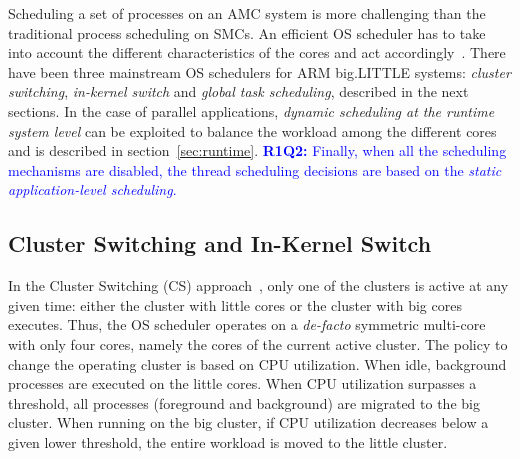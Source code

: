 Scheduling a set of processes on an AMC system is more challenging than the traditional process scheduling on SMCs. 
An efficient OS scheduler has to take into account the different characteristics of the cores and act accordingly~\cite{coolingAware}.
There have been three mainstream OS schedulers for ARM big.LITTLE systems: \textit{cluster switching}, 
\textit{in-kernel switch} and \textit{global task scheduling}, described in the next sections.
In the case of parallel applications, \textit{dynamic scheduling at the runtime system level} can be exploited to balance the workload among the different cores and is described in section~\ref{sec:runtime}.
\textcolor{blue}{\textbf{R1Q2: }Finally, when all the scheduling mechanisms are disabled, the thread scheduling decisions are based on the \textit{static application-level scheduling}.} 


\subsection{Cluster Switching and In-Kernel Switch}
In the Cluster Switching (CS) approach~\cite{samsung}, only one of the clusters is active at any given time: either the cluster with little cores or the cluster with big cores executes. Thus, the OS scheduler operates on a \emph{de-facto} symmetric multi-core with only four cores, namely the cores of the current active cluster. The policy to change the operating cluster is based on CPU utilization. When idle, background processes are executed on the little cores. When CPU utilization surpasses a threshold, all processes (foreground and background) are migrated to the big cluster. When running on the big cluster, if CPU utilization decreases below a given lower threshold, the entire workload is moved to the little cluster. 

